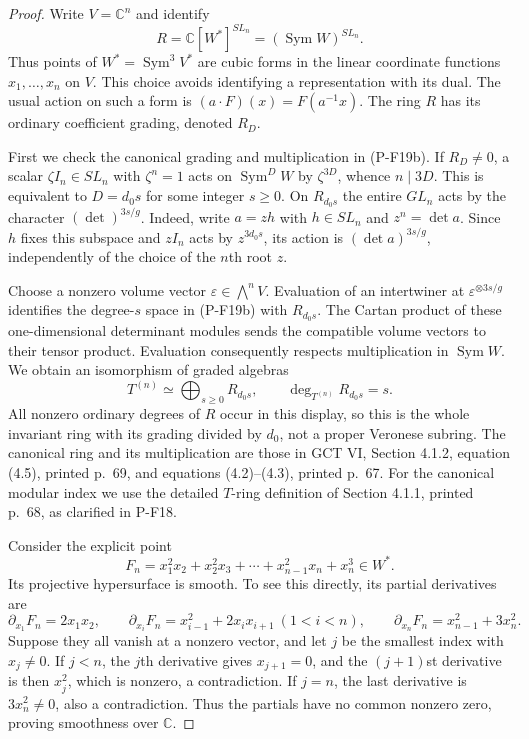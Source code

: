 \documentclass[11pt,a4paper]{article}
\begin{document}
\begin{proof}
Write $V=\mathbb C^n$ and identify
\[
 R=\mathbb C[W^*]^{SL_n}=(\operatorname{Sym}W)^{SL_n}.
 \tag{P-F19f}
\]
Thus points of $W^*=\operatorname{Sym}^3V^*$ are cubic forms in
the linear coordinate functions $x_1,\ldots,x_n$ on $V$.
This choice avoids identifying a representation with its dual.
The usual action on such a form is $(a\cdot F)(x)=F(a^{-1}x)$.
The ring $R$ has its ordinary coefficient grading, denoted $R_D$.

First we check the canonical grading and multiplication in (P-F19b).
If $R_D\ne0$, a scalar $\zeta I_n\in SL_n$ with $\zeta^n=1$
acts on $\operatorname{Sym}^D W$ by $\zeta^{3D}$, whence
$n\mid3D$. This is equivalent to $D=d_0s$ for some integer
$s\ge0$. On $R_{d_0s}$ the entire $GL_n$ acts by the character
$(\det)^{3s/g}$. Indeed, write $a=zh$ with $h\in SL_n$ and
$z^n=\det a$. Since $h$ fixes this subspace and $zI_n$ acts by
$z^{3d_0s}$, its action is $(\det a)^{3s/g}$, independently of
the choice of the $n$th root $z$.

Choose a nonzero volume vector $\varepsilon\in\bigwedge^nV$.
Evaluation of an intertwiner at $\varepsilon^{\otimes3s/g}$
identifies the degree-$s$ space in (P-F19b) with $R_{d_0s}$.
The Cartan product of these one-dimensional determinant modules
sends the compatible volume vectors to their tensor product.
Evaluation consequently respects multiplication in
$\operatorname{Sym}W$. We obtain an isomorphism of graded
algebras
\[
 T^{(n)}\simeq\bigoplus_{s\ge0}R_{d_0s},
 \qquad \deg_{T^{(n)}} R_{d_0s}=s.
 \tag{P-F19g}
\]
All nonzero ordinary degrees of $R$ occur in this display, so this
is the whole invariant ring with its grading divided by $d_0$,
not a proper Veronese subring. The canonical ring and its
multiplication are those in GCT VI, Section 4.1.2, equation (4.5),
printed p.~69, and equations (4.2)--(4.3), printed p.~67.
For the canonical modular index we use the detailed $T$-ring
definition of Section 4.1.1, printed p.~68, as clarified in P-F18.

Consider the explicit point
\[
 F_n=x_1^2x_2+x_2^2x_3+\cdots+x_{n-1}^2x_n+x_n^3
       \in W^*.
 \tag{P-F19h}
\]
Its projective hypersurface is smooth. To see this directly, its
partial derivatives are
\[
 \partial_{x_1}F_n=2x_1x_2,\qquad
 \partial_{x_i}F_n=x_{i-1}^2+2x_ix_{i+1}\ (1<i<n),\qquad
 \partial_{x_n}F_n=x_{n-1}^2+3x_n^2.
\]
Suppose they all vanish at a nonzero vector, and let $j$ be the
smallest index with $x_j\ne0$. If $j<n$, the $j$th derivative
gives $x_{j+1}=0$, and the $(j+1)$st derivative is then $x_j^2$,
which is nonzero, a contradiction. If $j=n$, the last derivative
is $3x_n^2\ne0$, also a contradiction. Thus the partials have
no common nonzero zero, proving smoothness over $\mathbb C$.


\end{proof}
\end{document}
